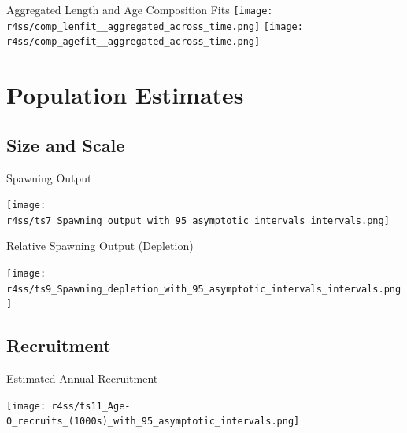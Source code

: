 \documentclass[pdf]{beamer}\usepackage[]{graphicx}\usepackage[]{color}
\begin{document}
\begin{frame}{Aggregated Length and Age Composition Fits}
  \texttt{[image: r4ss/comp\_lenfit\_\_aggregated\_across\_time.png]}
  \texttt{[image: r4ss/comp\_agefit\_\_aggregated\_across\_time.png]}
\end{frame}

\section{Population Estimates}
\subsection{Size and Scale}
\begin{frame}{Spawning Output}
  \begin{center}
    \texttt{[image: r4ss/ts7\_Spawning\_output\_with\_95\_asymptotic\_intervals\_intervals.png]}
  \end{center}
\end{frame}

\begin{frame}{Relative Spawning Output (Depletion)}
  \begin{center}
    \texttt{[image: r4ss/ts9\_Spawning\_depletion\_with\_95\_asymptotic\_intervals\_intervals.png]}
  \end{center}
\end{frame}

\subsection{Recruitment}
\begin{frame}{Estimated Annual Recruitment}
  \begin{center}
    \texttt{[image: r4ss/ts11\_Age-0\_recruits\_(1000s)\_with\_95\_asymptotic\_intervals.png]}
  \end{center}
\end{frame}
\end{document}
